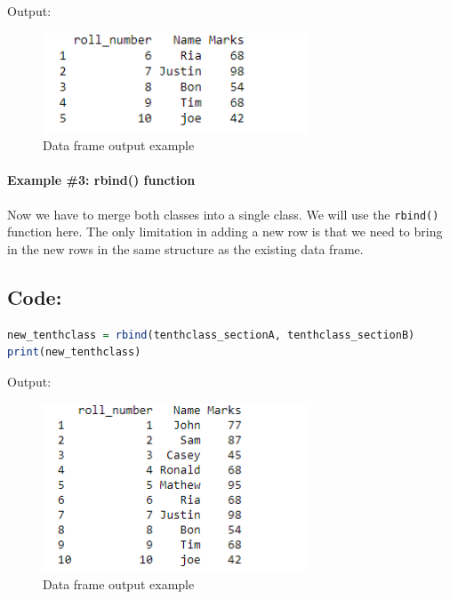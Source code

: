 \documentclass[10pt]{book}
\begin{document}
\noindent Output:
\begin{figure}[H]
    \begin{flushleft}
        \includegraphics[width=0.7\textwidth]{Data-Frames-in-R-1-7.png}
        \caption{Data frame output example}
        \label{fig:dataframe}
    \end{flushleft}
\end{figure}
\paragraph{Example \#3: rbind() function}
Now we have to merge both classes into a single class. We will use the \texttt{rbind()} function here. The only limitation in adding a new row is that we need to bring in the new rows in the same structure as the existing data frame.

\subsection*{Code:}
\begin{lstlisting}[language=R]
new_tenthclass = rbind(tenthclass_sectionA, tenthclass_sectionB)
print(new_tenthclass)
\end{lstlisting}

\noindent Output:
\begin{figure}[H]
    \begin{flushleft}
        \includegraphics[width=0.7\textwidth]{Data-Frames-in-R-1-8.png}
        \caption{Data frame output example}
        \label{fig:dataframe}
    \end{flushleft}
\end{figure}
\end{document}
